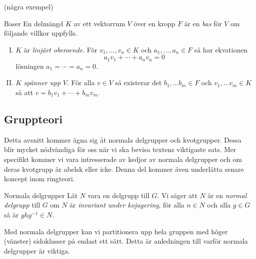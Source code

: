 \documentclass{article}
\theoremstyle{definition}
\begin{document}
(några exempel)

\begin{mydef}{Baser}{}
  En delmängd $K$ av ett vektorrum $V$ över en kropp $F$ är en \textit{bas} för $V$ om följande villkor uppfylls.  
  \begin{enumerate}[I)]
    \item $K$ är \textit{linjärt oberoende}. För $v_1, \ldots, v_n \in K$ och $a_1, \ldots, a_n \in F$ så har ekvationen 
    \[a_1v_1 + \cdots + a_n v_n = 0\]
    lösningen $a_1 = \cdots = a_n = 0$.
    \item $K$ \textit{spänner upp} $V$. För alla $v \in V$ så existerar det $b_1, \ldots b_m \in F$ och $v_1, \ldots v_m \in K$ så att 
    $v = b_1 v_1 + \cdots + b_m v_m$.
  \end{enumerate}
\end{mydef}

\subsection{Gruppteori}
Detta avsnitt kommer ägna sig åt normala delgrupper och kvotgrupper. Dessa blir mycket nödvändiga för oss när vi ska bevisa textens viktigaste sats. 
Mer specifikt kommer vi vara intresserade av kedjor av normala delgrupper och om deras kvotgrupp är abelsk eller icke. Denna 
del kommer även underlätta senare koncept inom ringteori.

\begin{mydef}{Normala delgrupper}{}
  Låt $N$ vara en delgrupp till $G$. Vi säger att $N$ är 
  en \textit{normal delgrupp} till $G$ om $N$ är 
  \textit{invariant under kojugering}, för alla $n \in N$ och 
  alla $g \in G$ så är $ghg^{-1} \in N$.
\end{mydef}
Med normala delgrupper kan vi partitionera upp hela gruppen med 
höger (vänster) sidoklasser på endast ett sätt. Detta 
är anledningen till varför normala delgrupper är viktiga. 
\end{document}
